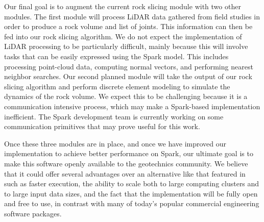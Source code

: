 Our final goal is to augment the current rock slicing module with two other modules. The first module will process LiDAR data gathered from field studies in order to produce a rock volume and list of joints. This information can then be fed into our rock slicing algorithm. We do not expect the implementation of LiDAR processing to be particularly difficult, mainly because this will involve tasks that can be easily expressed using the Spark model. This includes processing point-cloud data, computing normal vectors, and performing nearest neighbor searches. Our second planned module will take the output of our rock slicing algorithm and perform discrete element modeling to simulate the dynamics of the rock volume. We expect this to be challenging because it is a communication intensive process, which may make a Spark-based implementation inefficient. The Spark development team is currently working on some communication primitives that may prove useful for this work.

Once these three modules are in place, and once we have improved our implementation to achieve better performance on Spark, our ultimate goal is to make this software openly available to the geotechnics community. We believe that it could offer several advantages over an alternative like that featured in \cite{slicing} such as faster execution, the ability to scale both to large computing clusters and to large input data sizes, and the fact that the implementation will be fully open and free to use, in contrast with many of today's popular commercial engineering software packages.